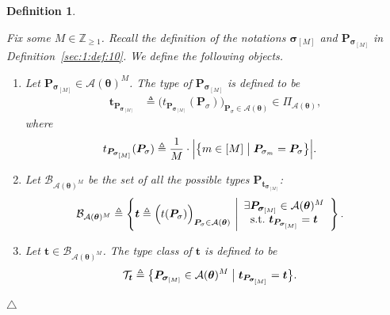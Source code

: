 \documentclass[journal,lettersize,twocolumn]{IEEEtran} %
\newtheorem{definition}[theorem]{Definition}
\newcommand{\edefinition}{\hfill$\triangle$}
\newcommand{\set}[1]{\mathcal{#1}}
\newcommand{\sZpp}{\mathbb{Z}_{\geq 1}}
\newcommand{\matr}[1]{ \bm{#1} }
\newcommand{\defeq}{ \triangleq }
\newcommand{\vsigma}{ \bm{\sigma} }
\newcommand{\mtheta}{\matr{\theta}}
\newcommand{\mP}{\matr{P}}
\newcommand{\setA}{ \set{A} }
\newcommand{\PiA}[1]{ \Pi_{\setA(#1)} }
\begin{document}
\begin{definition}
  \label{sec:1:def:17}

  Fix some $ M \in \sZpp $. Recall the definition of the notations
  $\vsigma_{[M]}$ and $\mP_{\vsigma_{[M]}}$ in
  Definition~\ref{sec:1:def:10}. We define the following objects.
  \begin{enumerate}

  \item Let $\mP_{\vsigma_{[M]}} \in \setA(\mtheta)^M$. The type of
    $ \mP_{\vsigma_{[M]}} $ is defined to be
    \begin{align*}
      \bm{t}_{\mP_{\vsigma_{[M]}}}
        &\defeq 
           \bigl(
             t_{ \mP_{\vsigma_{[M]}} }( \mP_{\sigma} ) 
          \bigr)_{ \mP_{\sigma} \in \setA(\mtheta) }
           \in \PiA{\mtheta},
    \end{align*}
    where
    \begin{align*}
      t_{\mP_{\vsigma_{[M]}}}( \mP_{\sigma} )
        &\defeq
           \frac{1}{M} 
           \cdot 
           \Bigl| 
             \bigl\{ 
               m \in [M] 
             \bigm|
               \mP_{\sigma_{m}} = \mP_{\sigma} 
             \bigr\}
           \Bigr|.
    \end{align*}

  \item Let $ \set{B}_{\setA(\mtheta)^{M}} $ be the set of all the possible types
    $ \mP_{\bm{t}_{ \vsigma_{[M]} }} $:
    \begin{align*}
      \set{B}_{\setA(\mtheta)^{M}}
        &\defeq 
           \left\{ 
             \bm{t} 
               \defeq 
                 \Bigl( t( \mP_{\sigma} ) \Bigr)_{ \mP_{\sigma} \in \setA(\mtheta) }
           \ \middle|
             \begin{array}{c}
               \exists \mP_{\vsigma_{[M]}} \in \setA(\mtheta)^{M} \\
               \text{s.t.} \ \bm{t}_{\mP_{\vsigma_{[M]}}} = \bm{t}
             \end{array}
           \right\}.
    \end{align*}

  \item Let $ \bm{t} \in \set{B}_{\setA(\mtheta)^{M}} $. The type class of
    $ \bm{t} $ is defined to be
    \begin{align*}
      \set{T}_{\bm{t}}
        &\defeq 
           \bigl\{ 
             \mP_{\vsigma_{[M]}} \in \setA(\mtheta)^{M}
           \bigm|
             \bm{t}_{\mP_{\vsigma_{[M]}}} = \bm{t}
           \bigr\}.
    \end{align*}

  \end{enumerate}
  \edefinition
\end{definition}
\end{document}

